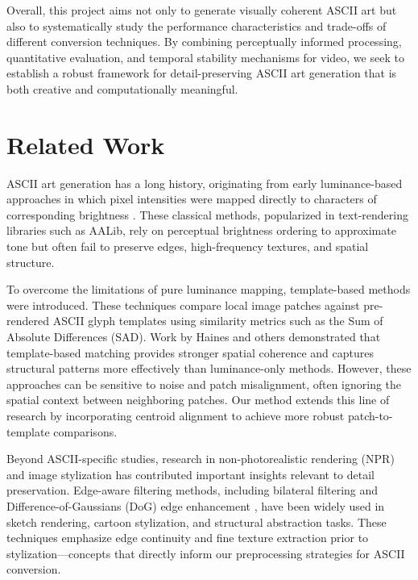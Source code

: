 \documentclass[10pt,twocolumn,letterpaper]{article}
\begin{document}
Overall, this project aims not only to generate visually coherent ASCII
art but also to systematically study the performance characteristics and
trade-offs of different conversion techniques. By combining
perceptually informed processing, quantitative evaluation, and temporal
stability mechanisms for video, we seek to establish a robust framework
for detail-preserving ASCII art generation that is both creative and
computationally meaningful.

\section{Related Work}
ASCII art generation has a long history, originating from early
luminance-based approaches in which pixel intensities were mapped
directly to characters of corresponding brightness
\cite{aalib1997}. These classical methods, popularized in text-rendering
libraries such as AALib, rely on perceptual brightness ordering to
approximate tone but often fail to preserve edges, high-frequency
textures, and spatial structure.

To overcome the limitations of pure luminance mapping, template-based
methods were introduced. These techniques compare local image patches
against pre-rendered ASCII glyph templates using similarity metrics such
as the Sum of Absolute Differences (SAD). Work by Haines
\cite{haines2007ascii} and others demonstrated that template-based
matching provides stronger spatial coherence and captures structural
patterns more effectively than luminance-only methods. However, these
approaches can be sensitive to noise and patch misalignment, often
ignoring the spatial context between neighboring patches. Our method
extends this line of research by incorporating centroid alignment to
achieve more robust patch-to-template comparisons.

Beyond ASCII-specific studies, research in non-photorealistic rendering
(NPR) and image stylization has contributed important insights relevant
to detail preservation. Edge-aware filtering methods, including
bilateral filtering \cite{tomasi1998bilateral} and Difference-of-Gaussians
(DoG) edge enhancement \cite{winnemoller2006realtime}, have been widely
used in sketch rendering, cartoon stylization, and structural
abstraction tasks. These techniques emphasize edge continuity and fine
texture extraction prior to stylization—concepts that directly inform
our preprocessing strategies for ASCII conversion.
\end{document}
